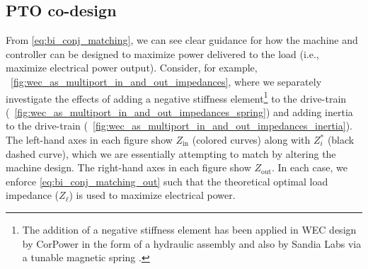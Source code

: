 \documentclass[twocolumn]{autart}
\begin{document}
\subsection{PTO co-design}\label{sec:pto_codesign}
From \eqref{eq:bi_conj_matching}, we can see clear guidance for how the machine and controller can be designed to maximize power delivered to the load (i.e., maximize electrical power output).
Consider, for example, \figurename~\ref{fig:wec_as_multiport_in_and_out_impedances}, where we separately investigate the effects of adding a negative stiffness element\footnote{The addition of a negative stiffness element has been applied in WEC design by CorPower in the form of a hydraulic assembly \cite{Todalshaug:2016aa} and also by Sandia Labs via a tunable magnetic spring \cite{Forbush:2024aa}.} to the drive-train (\figurename~\ref{fig:wec_as_multiport_in_and_out_impedances_spring}) and adding inertia to the drive-train (\figurename~\ref{fig:wec_as_multiport_in_and_out_impedances_inertia}).
The left-hand axes in each figure show $Z_{\textrm{in}}$ (colored curves) along with $Z_i^*$ (black dashed curve), which we are essentially attempting to match by altering the machine design.
The right-hand axes in each figure show $Z_{\textrm{out}}$.
In each case, we enforce \eqref{eq:bi_conj_matching_out} such that the theoretical optimal load impedance ($Z_\ell$) is used to maximize electrical power.
\end{document}
